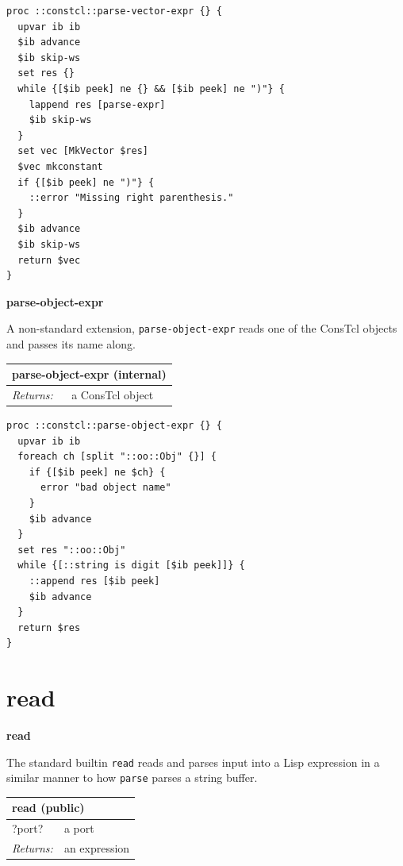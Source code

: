 \documentclass[twoside,9pt]{report}
\begin{document}
\noindent\makebox[\linewidth]{\rule{\linewidth}{0.4pt}}
\begin{lstlisting}
proc ::constcl::parse-vector-expr {} {
  upvar ib ib
  $ib advance
  $ib skip-ws
  set res {}
  while {[$ib peek] ne {} && [$ib peek] ne ")"} {
    lappend res [parse-expr]
    $ib skip-ws
  }
  set vec [MkVector $res]
  $vec mkconstant
  if {[$ib peek] ne ")"} {
    ::error "Missing right parenthesis."
  }
  $ib advance
  $ib skip-ws
  return $vec
}
\end{lstlisting}
\noindent\makebox[\linewidth]{\rule{\linewidth}{0.4pt}}

\textbf{parse-object-expr}


A non-standard extension, \texttt{parse-object-expr} reads one of the ConsTcl objects and passes its name along.

\begin{tabular}{ |l l| }
\hline
\multicolumn{2}{|l|}{parse-object-expr (internal)} \\
\hline
\textit{Returns:} & a ConsTcl object \\
\hline
\end{tabular}

\noindent\makebox[\linewidth]{\rule{\linewidth}{0.4pt}}
\begin{lstlisting}
proc ::constcl::parse-object-expr {} {
  upvar ib ib
  foreach ch [split "::oo::Obj" {}] {
    if {[$ib peek] ne $ch} {
      error "bad object name"
    }
    $ib advance
  }
  set res "::oo::Obj"
  while {[::string is digit [$ib peek]]} {
    ::append res [$ib peek]
    $ib advance
  }
  return $res
}
\end{lstlisting}
\noindent\makebox[\linewidth]{\rule{\linewidth}{0.4pt}}
\section{read}
\label{read}

\textbf{read}


The standard builtin \texttt{read} reads and parses input into a Lisp expression in a similar manner to how \texttt{parse} parses a string buffer.

\begin{tabular}{ |l l| }
\hline
\multicolumn{2}{|l|}{read (public)} \\
\hline
?port? & a port \\
\textit{Returns:} & an expression \\
\hline
\end{tabular}
\end{document}
